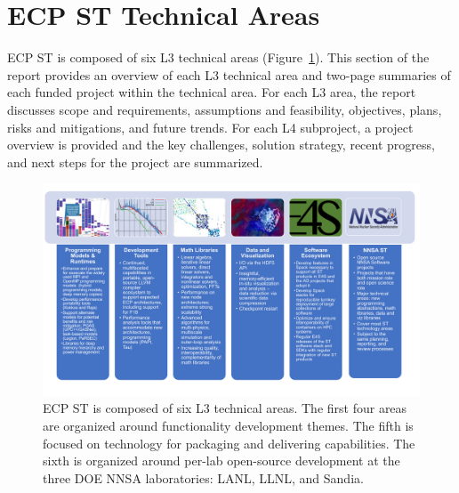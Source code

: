 \documentclass{ecpreport-publicv1}
\begin{document}
\clearpage
\newpage
\section{ECP ST Technical Areas}\label{sect:project-summaries}

ECP ST is composed of six L3 technical areas (Figure~\ref{fig:l3-overview}).  This section of the report provides an overview of each L3 technical area and two-page summaries of each funded project within the technical area.  For each L3 area, the report discusses scope and requirements, assumptions and feasibility, objectives, plans, risks and mitigations, and future trends.  For each L4 subproject, a project overview is provided and the key challenges, solution strategy, recent progress, and next steps for the project are summarized.
\
\begin{figure}[H]
	\centering
	\includegraphics[width=1.0\linewidth]{L3-Overview}
	\caption{ECP ST is composed of six L3 technical areas.  The first four areas are organized around functionality development themes.  The fifth is focused on technology for packaging and delivering capabilities.  The sixth is organized around per-lab open-source development at the three DOE NNSA laboratories: LANL, LLNL, and Sandia.  }
	\label{fig:l3-overview}
\end{figure}
\end{document}
